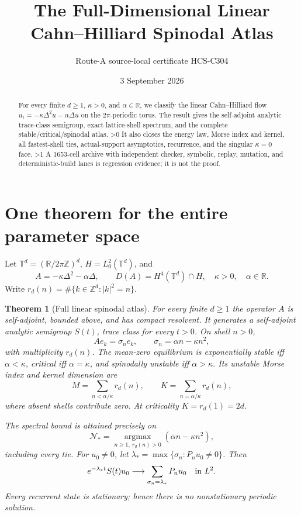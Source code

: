 \documentclass[10pt]{article}
\title{The Full-Dimensional Linear Cahn--Hilliard Spinodal Atlas}
\author{Route-A source-local certificate HCS-C304}
\date{3 September 2026}
\providecommand{\CRevisionRound}{2}
\newtheorem{theorem}{Theorem}
\newcommand{\T}{\mathbb T}
\begin{document}
\maketitle
\begin{abstract}
For every finite $d\ge1$, $\kappa>0$, and $\alpha\in\mathbb R$, we
classify the linear Cahn--Hilliard flow
$u_t=-\kappa\Delta^2u-\alpha\Delta u$ on the $2\pi$-periodic torus.
The result gives the self-adjoint analytic trace-class semigroup, exact
lattice-shell spectrum, and the complete stable/critical/spinodal atlas.
\ifnum\CRevisionRound>0
It also closes the energy law, Morse index and kernel, all fastest-shell ties,
actual-support asymptotics, recurrence, and the singular $\kappa=0$ face.
\fi
\ifnum\CRevisionRound>1
A 1653-cell archive with independent checker, symbolic, replay, mutation,
and deterministic-build lanes is regression evidence; it is not the proof.
\fi
\end{abstract}

\section{One theorem for the entire parameter space}
Let $\T^d=(\mathbb R/2\pi\mathbb Z)^d$, $H=L^2_0(\T^d)$, and
\[
 A=-\kappa\Delta^2-\alpha\Delta,\qquad
 D(A)=H^4(\T^d)\cap H,
 \quad \kappa>0,\quad\alpha\in\mathbb R.
\]
Write $r_d(n)=\#\{k\in\mathbb Z^d:|k|^2=n\}$.

\begin{theorem}[Full linear spinodal atlas]\label{thm:atlas}
For every finite $d\ge1$ the operator $A$ is self-adjoint, bounded above,
and has compact resolvent. It generates a self-adjoint analytic semigroup
$S(t)$, trace class for every $t>0$. On shell $n>0$,
\begin{equation}\label{eq:rate}
 Ae_k=\sigma_ne_k,\qquad \sigma_n=\alpha n-\kappa n^2,
\end{equation}
with multiplicity $r_d(n)$. The mean-zero equilibrium is exponentially
stable iff $\alpha<\kappa$, critical iff $\alpha=\kappa$, and spinodally
unstable iff $\alpha>\kappa$. Its unstable Morse index and kernel dimension
are
\begin{equation}\label{eq:index}
 M=\sum_{n<\alpha/\kappa}r_d(n),\qquad
 K=\sum_{n=\alpha/\kappa}r_d(n),
\end{equation}
where absent shells contribute zero. At criticality $K=r_d(1)=2d$.

The spectral bound is attained precisely on
\begin{equation}\label{eq:fast}
 \mathcal N_*=\operatorname*{argmax}_{n\ge1,\ r_d(n)>0}
 (\alpha n-\kappa n^2),
\end{equation}
including every tie. For $u_0\ne0$, let
$\lambda_*=\max\{\sigma_n:P_nu_0\ne0\}$. Then
\begin{equation}\label{eq:limit}
 e^{-\lambda_*t}S(t)u_0\longrightarrow
 \sum_{\sigma_n=\lambda_*}P_nu_0\quad\hbox{in }L^2.
\end{equation}
Every recurrent state is stationary; hence there is no nonstationary
periodic solution.
\end{theorem}
\end{document}
